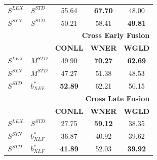 \documentclass{llncs}
\begin{document}
\begin{table}[!tb]
\begin{minipage}[t]{0.48\textwidth}
\begin{tabular}{@{}llccc@{}}
$S^{\scriptscriptstyle LEX}$ & $S^{\scriptscriptstyle STD}$ & 55.64                      & \textbf{67.70}                     & 48.00                     \\
$S^{\scriptscriptstyle SYN}$ & $S^{\scriptscriptstyle STD}$ & 50.21                      & 58.41                     & \textbf{49.81}                     \\
\midrule
          &           & \multicolumn{3}{r}{\textbf{Cross Early Fusion}} \\
\midrule
          &           & \textbf{CONLL}                      & \textbf{WNER}                      & \textbf{WGLD}                      \\ \cmidrule{3-5}
$S^{\scriptscriptstyle LEX}$ &$M^{\scriptscriptstyle STD}$        & 49.90                      & \textbf{70.27}                     & \textbf{62.69}                     \\
$S^{\scriptscriptstyle SYN}$ & $M^{\scriptscriptstyle STD}$ & 47.27                      & 51.38                     & 48.53                     \\
$S^{\scriptscriptstyle STD}$ & ${b}^*_{\scriptscriptstyle XEF}$        & \textbf{52.89}                      & 62.21                     & 50.15                     \\
\midrule
          &           & \multicolumn{3}{r}{\textbf{Cross Late Fusion}}  \\
\midrule
          &           & \textbf{CONLL}                      & \textbf{WNER}                      & \textbf{WGLD}                      \\ \cmidrule{3-5}
$S^{\scriptscriptstyle LEX}$ & $S^{\scriptscriptstyle STD}$ & 27.75                      & \textbf{59.12}                     & 38.35                     \\
$S^{\scriptscriptstyle SYN}$ & ${b}_{\scriptscriptstyle XLF}^{*}$       & 36.87                      & 40.92                     & 39.62                     \\
$S^{\scriptscriptstyle STD}$ & ${b}_{\scriptscriptstyle XLF}^{*}$        & \textbf{41.89}                      & 52.03                     & \textbf{39.92}                     \\ \bottomrule
\end{tabular}

\end{minipage}
\centering
\hfill
\begin{minipage}[t]{0.48\textwidth}
\centering


\end{minipage}
\end{table}
\end{document}
